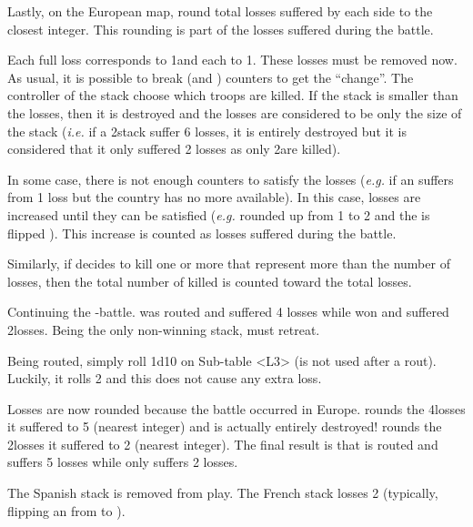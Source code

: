 Lastly, on the European map, round total losses suffered by each side to the
closest integer. This rounding is part of the losses suffered during the
battle.

Each full loss corresponds to 1\LD and each \texttu to 1\LDE. These losses
must be removed now. As usual, it is possible to break \ARMY (and \LD)
counters to get the ``change''. The controller of the stack choose which
troops are killed. If the stack is smaller than the losses, then it is
destroyed and the losses are considered to be only the size of the stack
(\emph{i.e.} if a 2\LD stack suffer 6 losses, it is entirely destroyed but it
is considered that it only suffered 2 losses as only 2\LD are killed).

In some case, there is not enough counters to satisfy the losses (\emph{e.g.}
if an \ARMY\faceplus suffers from 1 loss but the country has no more \LD
available). In this case, losses are increased until they can be satisfied
(\emph{e.g.} rounded up from 1 to 2 and the \ARMY\faceplus is flipped
\Facemoins). This increase is counted as losses suffered during the battle.

Similarly, if \TUR decides to kill one or more \Pashas that represent more \LD
than the number of losses, then the total number of \LD killed is counted
toward the total losses.

\begin{exemple}[Retreat]
  Continuing the \FRA-\HIS battle. \HIS was routed and suffered 4\texttd
  losses while \FRA won and suffered 2\texttu losses. Being the only
  non-winning stack, \HIS must retreat.

  Being routed, \HIS simply roll 1d10 on Sub-table <L3> (\Man is not used
  after a rout). Luckily, it rolls 2 and this does not cause any extra loss.

  Losses are now rounded because the battle occurred in Europe. \HIS rounds
  the 4\texttd losses it suffered to 5 (nearest integer) and is actually
  entirely destroyed!  \FRA rounds the 2\texttu losses it suffered to 2
  (nearest integer). The final result is that \HIS is routed and suffers 5
  losses while \FRA only suffers 2 losses.

  The Spanish stack is removed from play. The French stack losses 2\LD
  (typically, flipping an \ARMY from \Faceplus to \Facemoins).
\end{exemple}

